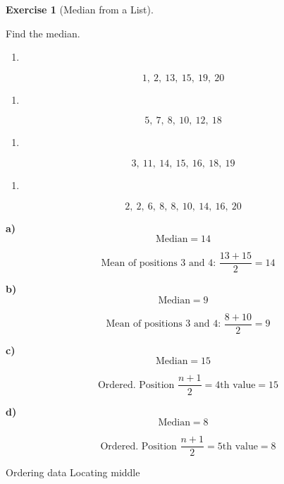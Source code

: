 \documentclass[
  letterpaper,
  DIV=11,
  numbers=noendperiod]{scrreprt}
\providecommand{\tightlist}{%
  \setlength{\itemsep}{0pt}\setlength{\parskip}{0pt}}
\theoremstyle{definition}
\newtheorem{exercise}{Exercise}[chapter]
\theoremstyle{remark}
\begin{document}
\begin{exercise}[Median from a
List]\protect\hypertarget{exr-avg-2}{}\label{exr-avg-2}

Find the median.

\begin{enumerate}
\def\labelenumi{\alph{enumi})}
\tightlist
\item
\end{enumerate}

\[1,\ 2,\ 13,\ 15,\ 19,\ 20\]

\begin{enumerate}
\def\labelenumi{\alph{enumi})}
\setcounter{enumi}{1}
\tightlist
\item
\end{enumerate}

\[5,\ 7,\ 8,\ 10,\ 12,\ 18\]

\begin{enumerate}
\def\labelenumi{\alph{enumi})}
\setcounter{enumi}{2}
\tightlist
\item
\end{enumerate}

\[3,\ 11,\ 14,\ 15,\ 16,\ 18,\ 19\]

\begin{enumerate}
\def\labelenumi{\alph{enumi})}
\setcounter{enumi}{3}
\tightlist
\item
\end{enumerate}

\[2,\ 2,\ 6,\ 8,\ 8,\ 10,\ 14,\ 16,\ 20\]

\begin{tcolorbox}[enhanced jigsaw, opacitybacktitle=0.6, coltitle=black, arc=.35mm, colframe=quarto-callout-tip-color-frame, colback=white, bottomrule=.15mm, left=2mm, colbacktitle=quarto-callout-tip-color!10!white, titlerule=0mm, opacityback=0, title=\textcolor{quarto-callout-tip-color}{\faLightbulb}\hspace{0.5em}{🔍 View Solution}, leftrule=.75mm, breakable, rightrule=.15mm, bottomtitle=1mm, toptitle=1mm, toprule=.15mm]

\textbf{a)} \[\text{Median} = 14\]

\[\quad \text{Mean of positions 3 and 4: }\frac{13+15}{2}=14\]

\textbf{b)} \[\text{Median} = 9\]

\[\quad \text{Mean of positions 3 and 4: }\frac{8+10}{2}=9\]

\textbf{c)} \[\text{Median} = 15\]

\[\quad \text{Ordered. Position }\frac{n+1}{2}=4\text{th value} = 15\]

\textbf{d)} \[\text{Median} = 8\]

\[\quad \text{Ordered. Position }\frac{n+1}{2}=5\text{th value} = 8\]

\end{tcolorbox}

{Ordering data} {Locating middle}

\end{exercise}
\end{document}

